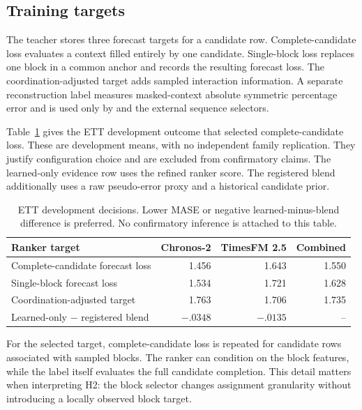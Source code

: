 \subsection{Training targets}

The teacher stores three forecast targets for a candidate row. Complete-candidate loss evaluates a context filled entirely by one candidate. Single-block loss replaces one block in a common anchor and records the resulting forecast loss. The coordination-adjusted target adds sampled interaction information. A separate reconstruction label measures masked-context absolute symmetric percentage error and is used only by \segrecon and the external sequence selectors.

Table~\ref{tab:target-development} gives the ETT development outcome that selected complete-candidate loss. These are development means, with no independent family replication. They justify configuration choice and are excluded from confirmatory claims. The learned-only evidence row uses the refined ranker score. The registered blend additionally uses a raw pseudo-error proxy and a historical candidate prior.

\begin{table}[h]
\caption{ETT development decisions. Lower MASE or negative learned-minus-blend difference is preferred. No confirmatory inference is attached to this table.}
\label{tab:target-development}
\centering
\small
\begin{tabular}{lrrr}
\toprule
Ranker target & Chronos-2 & TimesFM 2.5 & Combined \\
\midrule
Complete-candidate forecast loss & 1.456 & 1.643 & 1.550 \\
Single-block forecast loss & 1.534 & 1.721 & 1.628 \\
Coordination-adjusted target & 1.763 & 1.706 & 1.735 \\
\midrule
Learned-only $-$ registered blend & $-.0348$ & $-.0135$ & -- \\
\bottomrule
\end{tabular}
\end{table}

For the selected target, complete-candidate loss is repeated for candidate rows associated with sampled blocks. The ranker can condition on the block features, while the label itself evaluates the full candidate completion. This detail matters when interpreting H2: the block selector changes assignment granularity without introducing a locally observed block target.


